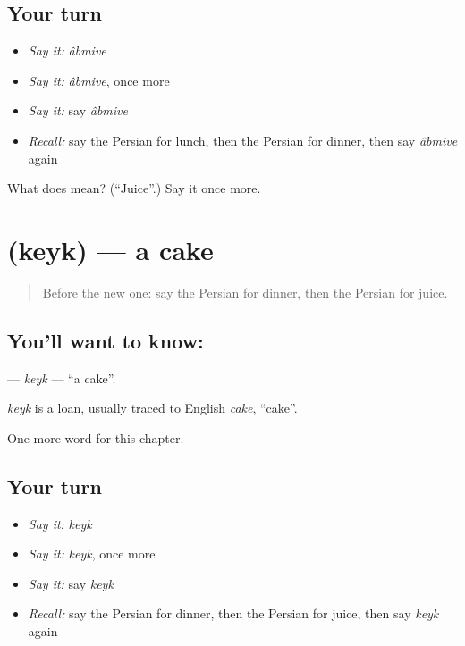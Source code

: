 \subsection*{Your turn}
\begin{itemize}
\raggedright
  \item \emph{Say it:} \emph{âbmive}
  \item \emph{Say it:} \emph{âbmive}, once more
  \item \emph{Say it:} say \emph{âbmive}
  \item \emph{Recall:} say the Persian for lunch, then the Persian for dinner, then say \emph{âbmive} again
\end{itemize}

\begin{tcolorbox}[breakable,colback=teal!4,colframe=teal!35!black,title={Before you move on}]
What does  mean? (\textquotedblleft{}Juice\textquotedblright{}.) Say it once more.
\end{tcolorbox}
\section[\texorpdfstring{\fa{کیک} (keyk)}{کیک (keyk)}]{ (keyk) — a cake}

\label{lesson:FA-C44-keyk}



\begin{quote}
Before the new one: say the Persian for dinner, then the Persian for juice.
\end{quote}

\subsection*{You'll want to know: }
\textbf{} — \emph{keyk} — \textquotedblleft{}a cake\textquotedblright{}.

\begin{cousinweb}
\emph{keyk} is a loan, usually traced to English \emph{cake}, \textquotedblleft{}cake\textquotedblright{}.
\end{cousinweb}

\begin{grammarlens}[title={What you've built}]
One more word for this chapter.
\end{grammarlens}

\subsection*{Your turn}
\begin{itemize}
\raggedright
  \item \emph{Say it:} \emph{keyk}
  \item \emph{Say it:} \emph{keyk}, once more
  \item \emph{Say it:} say \emph{keyk}
  \item \emph{Recall:} say the Persian for dinner, then the Persian for juice, then say \emph{keyk} again
\end{itemize}

